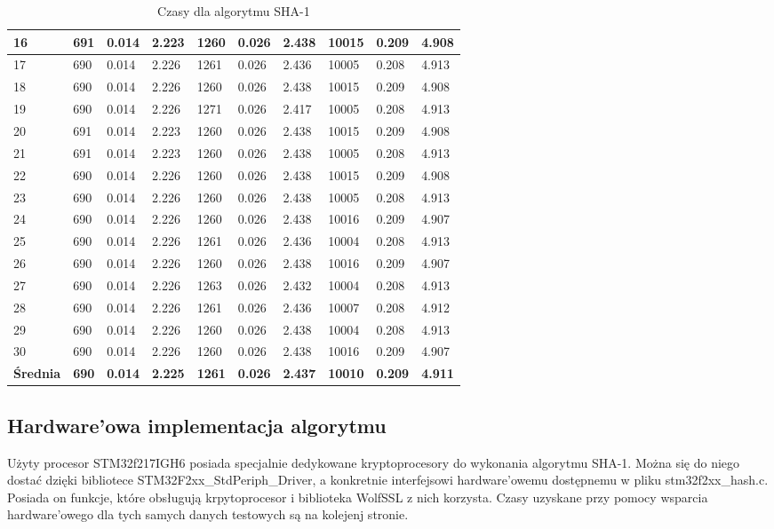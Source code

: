 \documentclass[oneside]{mgr}
\begin{document}
\begin{table}[!h]
\begin{tabularx}{\linewidth}{|X|X|X|X|X|X|X|X|X|X|}
16 &	691	& 0.014 &	2.223 &	1260 &	0.026 &	2.438 &	10015 &	0.209 &	4.908 \\ \hline
17 &	690	& 0.014 &	2.226 &	1261 &	0.026 &	2.436 &	10005 &	0.208 &	4.913 \\ \hline
18 &	690	& 0.014 &	2.226 &	1260 &	0.026 &	2.438 &	10015 &	0.209 &	4.908 \\ \hline
19 &	690	& 0.014 &	2.226 &	1271 &	0.026 &	2.417 &	10005 &	0.208 &	4.913 \\ \hline
20 &	691	& 0.014 &	2.223 &	1260 &	0.026 &	2.438 &	10015 &	0.209 &	4.908 \\ \hline
21 &	691	& 0.014 &	2.223 &	1260 &	0.026 &	2.438 &	10005 &	0.208 &	4.913 \\ \hline
22 &	690	& 0.014 &	2.226 &	1260 &	0.026 &	2.438 &	10015 &	0.209 &	4.908 \\ \hline
23 &	690	& 0.014 &	2.226 &	1260 &	0.026 &	2.438 &	10005 &	0.208 &	4.913 \\ \hline
24 &	690	& 0.014 &	2.226 &	1260 &	0.026 &	2.438 &	10016 &	0.209 &	4.907 \\ \hline
25 &	690	& 0.014 &	2.226 &	1261 &	0.026 &	2.436 &	10004 &	0.208 &	4.913 \\ \hline
26 &	690	& 0.014 &	2.226 &	1260 &	0.026 &	2.438 &	10016 &	0.209 &	4.907 \\ \hline
27 &	690	& 0.014 &	2.226 &	1263 &	0.026 &	2.432 &	10004 &	0.208 &	4.913 \\ \hline
28 &	690	& 0.014 &	2.226 &	1261 &	0.026 &	2.436 &	10007 &	0.208 &	4.912 \\ \hline
29 &	690	& 0.014 &	2.226 &	1260 &	0.026 &	2.438 &	10004 &	0.208 &	4.913 \\ \hline
30 &	690	& 0.014 &	2.226 &	1260 &	0.026 &	2.438 &	10016 &	0.209 &	4.907 \\ \hline
\textbf{Średnia}	& \textbf{690} &	\textbf{0.014} &	\textbf{2.225} &	\textbf{1261} &	\textbf{0.026} &	\textbf{2.437} &	\textbf{10010} &	\textbf{0.209} & \textbf{4.911} \\ \hline
    \end{tabularx}
    \caption{Czasy dla algorytmu SHA-1}
\end{table}
\subsection{Hardware'owa implementacja algorytmu}

Użyty procesor STM32f217IGH6 posiada specjalnie dedykowane kryptoprocesory do wykonania algorytmu SHA-1. Można się do niego dostać dzięki bibliotece STM32F2xx\_StdPeriph\_Driver, a konkretnie interfejsowi hardware'owemu dostępnemu w pliku stm32f2xx\_hash.c. Posiada on funkcje, które obsługują krpytoprocesor i biblioteka WolfSSL z nich korzysta. Czasy uzyskane przy pomocy wsparcia hardware'owego dla tych samych danych testowych są na kolejenj stronie.
\end{document}
